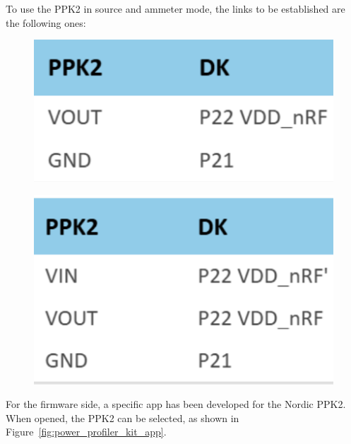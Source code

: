 \documentclass{Configuration_Files/PoliMi3i_thesis}
\begin{document}
To use the PPK2 in source and ammeter mode, the links to be established are the following ones:

\begin{figure}[h]
    \centering
    \includegraphics[scale=0.3]{Test_Procedure/9.png}
    \label{fig:pin_connections_source_meter}
\end{figure}

\begin{figure}[h]
    \centering
    \includegraphics[scale=0.3]{Test_Procedure/10.png}
    \label{fig:pin_connections_amperemeter}
\end{figure}

For the firmware side, a specific app has been developed for the Nordic PPK2. When opened, the PPK2 can be selected, as shown in Figure~\ref{fig:power_profiler_kit_app}.
\end{document}
